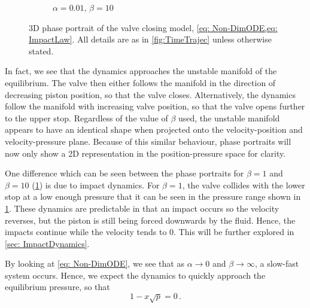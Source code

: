 \begin{figure}[ht]
\begin{subfigure}{0.49\textwidth}
    \caption{$\alpha = 0.01, \, \beta = 10$}
    \end{subfigure}
    \caption{3D phase portrait of the valve closing model, \cref{eq: Non-DimODE,eq: ImpactLaw}. All details are as in \cref{fig:TimeTrajec} unless otherwise stated.}
    \label{fig: ValveClose3DPhase}
\end{figure}

\newpage
In fact, we see that the dynamics approaches the unstable manifold of the equilibrium. The valve then either follows the manifold in the direction of decreasing piston position, so that the valve closes. Alternatively, the dynamics follow the manifold with increasing valve position, so that the valve opens further to the upper stop. Regardless of the value of $\beta$ used, the unstable manifold appears to have an identical shape when projected onto the velocity-position and velocity-pressure plane. Because of this similar behaviour, phase portraits will now only show a 2D representation in the position-pressure space for clarity.

One difference which can be seen between the phase portraits for $\beta = 1$ and $\beta = 10$ (\cref{fig: ValveClose3DPhase}) is due to impact dynamics. For $\beta = 1$, the valve collides with the lower stop at a low enough pressure that it can be seen in the pressure range shown in \cref{fig: ValveClose3DPhase}. These dynamics are predictable in that an impact occurs so the velocity reverses, but the piston is still being forced downwards by the fluid. Hence, the impacts continue while the velocity tends to 0. This will be further explored in \cref{sec: ImpactDynamics}.

By looking at \cref{eq: Non-DimODE}, we see that as $\alpha \rightarrow 0$ and $\beta \rightarrow \infty$, a slow-fast system occurs. Hence, we expect the dynamics to quickly approach the equilibrium pressure, so that
~
\begin{equation*}
    1 - x \sqrt{p} = 0 \, .
\end{equation*}

